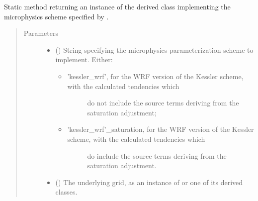 \documentclass[letterpaper,10pt,english]{sphinxmanual}
\begin{document}
\begin{fulllineitems}
\begin{fulllineitems}
\end{fulllineitems}


\begin{fulllineitems}
\label{\detokenize{api:parameterizations.slow_tendencies.SlowTendencyMicrophysics.factory}}
Static method returning an instance of the derived class implementing the microphysics scheme
specified by .
\begin{quote}\begin{description}
\item[{Parameters}] \leavevmode\begin{itemize}
\item {} 
 () \textendash{} 
String specifying the microphysics parameterization scheme to implement. Either:
\begin{itemize}
\item {} \begin{description}
\item[{’kessler\_wrf’, for the WRF version of the Kessler scheme, with the calculated tendencies which}] \leavevmode
do not include the source terms deriving from the saturation adjustment;

\end{description}

\item {} \begin{description}
\item[{’kessler\_wrf’\_saturation, for the WRF version of the Kessler scheme, with the calculated tendencies which}] \leavevmode
do include the source terms deriving from the saturation adjustment.

\end{description}

\end{itemize}


\item {} 
 () \textendash{} The underlying grid, as an instance of {\hyperref[\detokenize{api:grids.grid_xyz.GridXYZ}]{}} or one of its derived classes.


\end{itemize}
\end{description}
\end{quote}
\end{fulllineitems}
\end{fulllineitems}
\end{document}
